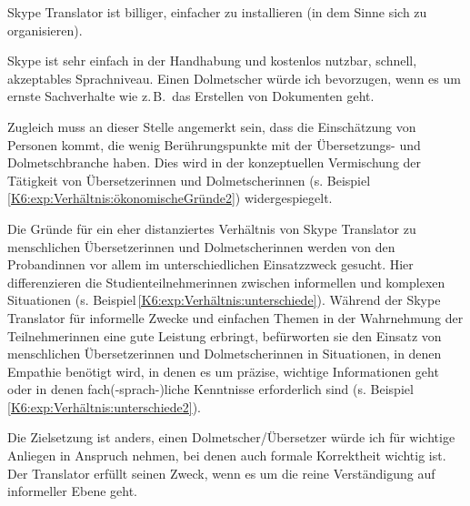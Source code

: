 \begin{example}
	\label{K6:exp:Verhältnis:ökonomischeGründe}
	Skype Translator ist billiger, einfacher zu installieren (in dem Sinne sich zu organisieren).
\end{example}

\begin{example}
	\label{K6:exp:Verhältnis:ökonomischeGründe2}
	Skype ist sehr einfach in der Handhabung und kostenlos nutzbar, schnell, akzeptables Sprachniveau.
	Einen Dolmetscher würde ich bevorzugen, wenn es um ernste Sachverhalte wie z.\,B.\ das Erstellen von Dokumenten geht.
\end{example}

Zugleich muss an dieser Stelle angemerkt sein, dass die Einschätzung von Personen kommt, die wenig Berührungspunkte mit der Übersetzungs- und Dolmetschbranche haben. Dies wird in der konzeptuellen Vermischung der Tätigkeit von Übersetzer{\textperiodcentered}innen und Dolmetscher{\textperiodcentered}innen (s. Beispiel\,\ref{K6:exp:Verhältnis:ökonomischeGründe2}) widergespiegelt.

\begin{sloppypar}
Die Gründe für ein eher distanziertes Verhältnis von Skype Translator zu menschlichen Übersetzer{\textperiodcentered}innen und Dolmetscher{\textperiodcentered}innen werden von den Proband{\textperiodcentered}innen vor allem im unterschiedlichen Einsatzzweck gesucht. Hier differenzieren die Studienteilnehmer{\textperiodcentered}innen zwischen informellen und komplexen Situationen (s. Beispiel\,\ref{K6:exp:Verhältnis:unterschiede}). Während der Skype Translator für informelle Zwecke und einfachen Themen in der Wahrnehmung der Teilnehmer{\textperiodcentered}innen eine gute Leistung erbringt, befürworten sie den Einsatz von menschlichen Übersetzer{\textperiodcentered}innen und Dolmetscher{\textperiodcentered}innen in Situationen, in denen Empathie benötigt wird, in denen es um präzise, wichtige Informationen geht oder in denen fach(-sprach-)liche Kenntnisse erforderlich sind (s. Beispiel\,\ref{K6:exp:Verhältnis:unterschiede2}).
\end{sloppypar}

\begin{example}
	\label{K6:exp:Verhältnis:unterschiede}
	Die Zielsetzung ist anders, einen Dolmetscher/Übersetzer würde ich für wichtige Anliegen in Anspruch nehmen, bei denen auch formale Korrektheit wichtig ist. Der Translator erfüllt seinen Zweck, wenn es um die reine Verständigung auf informeller Ebene geht.
\end{example}


